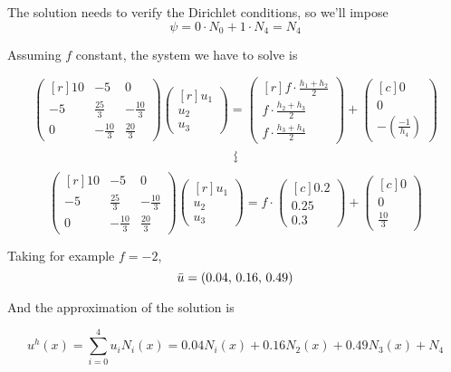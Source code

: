 \begin{example}
The solution needs to verify the Dirichlet conditions, so we'll impose $$\psi = 0\cdot N_0 + 1\cdot N_4 = N_4$$

Assuming $f$ constant, the system we have to solve is

\[
  \begin{pmatrix*}[r]
    10 & -5            & 0\\
    -5 & \frac{25}{3}  & -\frac{10}{3}\\
    0  & -\frac{10}{3} & \frac{20}{3}
  \end{pmatrix*}
  \begin{pmatrix*}[r]
    u_1\\ u_2 \\ u_3
  \end{pmatrix*} =
  \begin{pmatrix*}[r]
    f\cdot \frac{h_1 + h_2}{2}\\f\cdot \frac{h_2 + h_3}{2}\\f\cdot \frac{h_3 + h_4}{2}
  \end{pmatrix*} + 
  \begin{pmatrix*}[c]
    0\\0\\ -\left(\frac{-1}{h_4}\right)
  \end{pmatrix*}
\]
$$\text{\rotatebox{270}{$\leadsto$}}$$
\[
  \begin{pmatrix*}[r]
    10 & -5            & 0\\
    -5 & \frac{25}{3}  & -\frac{10}{3}\\
    0  & -\frac{10}{3} & \frac{20}{3}
  \end{pmatrix*}
  \begin{pmatrix*}[r]
    u_1\\ u_2 \\ u_3
  \end{pmatrix*} =
  f\cdot\begin{pmatrix*}[c]
    0.2\\0.25\\0.3
  \end{pmatrix*} + 
  \begin{pmatrix*}[c]
    0\\0\\ \frac{10}{3}
  \end{pmatrix*}
\]

Taking for example $f=-2$, $$\Bar{u} = (0.04,\, 0.16,\,0.49)$$

And the approximation of the solution is

\[
  u^h(x) = \sum_{i=0}^4u_iN_i(x) = 0.04N_i(x) + 0.16N_2(x) + 0.49N_3(x) + N_4
\]

\end{example}